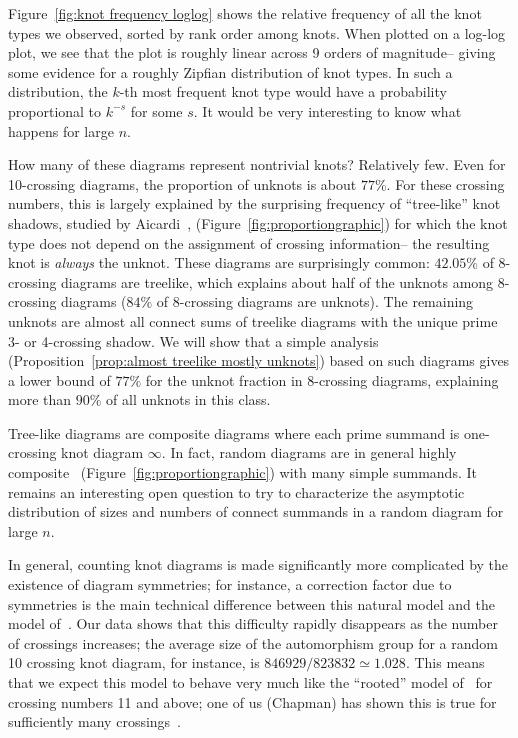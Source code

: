\documentclass[amsmath,secnumarabic,floatfix,amssymb,nofootinbib,nobibnotes,letterpaper,11pt,tightenlines,showkeys]{revtex4}
\theoremstyle{definition}
\begin{document}
Figure~\ref{fig:knot frequency loglog} shows the relative frequency of all the knot types we observed, sorted by rank order among knots. When plotted on a log-log plot, we see that the plot is roughly linear across 9 orders of magnitude-- giving some evidence for a roughly Zipfian distribution of knot types. In such a distribution, the $k$-th most frequent knot type would have a probability proportional to $k^{-s}$ for some $s$. It would be very interesting to know what happens for large $n$.

How many of these diagrams represent nontrivial knots? Relatively few. Even for 10-crossing diagrams, the proportion of unknots is about $77\%$. For these crossing numbers, this is largely explained by the surprising frequency of ``tree-like'' knot shadows, studied by Aicardi~\cite{Aicardi:1994uq}, (Figure~\ref{fig:proportiongraphic}) for which the knot type does not depend on the assignment of crossing information-- the resulting knot is \emph{always} the unknot. These diagrams are surprisingly common: $42.05\%$ of 8-crossing diagrams are treelike, which explains about half of the unknots among 8-crossing diagrams ($84\%$ of 8-crossing diagrams are unknots). The remaining unknots are almost all connect sums of treelike diagrams with the unique prime 3- or 4-crossing shadow. We will show that a simple analysis (Proposition~\ref{prop:almost treelike mostly unknots}) based on such diagrams gives a lower bound of $77\%$ for the unknot fraction in 8-crossing diagrams, explaining more than $90\%$ of all unknots in this class. 

Tree-like diagrams are composite diagrams where each prime summand is one-crossing knot diagram $\infty$. In fact, random diagrams are in general highly composite~\cite{Chapman2015knotasymp} (Figure~\ref{fig:proportiongraphic}) with many simple summands. It remains an interesting open question to try to characterize the asymptotic distribution of sizes and numbers of connect summands in a random diagram for large $n$.

In general, counting knot diagrams is made significantly more complicated by the existence of diagram symmetries; for instance, a correction factor due to symmetries is the main technical difference between this natural model and the model of~\cite{Schaeffer:2004tt}. Our data shows that this difficulty rapidly disappears as the number of crossings increases; the average size of the automorphism group for a random 10 crossing knot diagram, for instance, is $846929/823832 \simeq 1.028$. This means that we expect this model to behave very much like the ``rooted'' model of~\cite{Schaeffer:2004tt} for crossing numbers 11 and above; one of us (Chapman) has shown this is true for sufficiently many crossings~\cite{Chapman2015knotasymp}.
\end{document}
